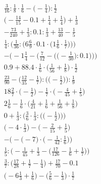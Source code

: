 \documentclass[8pt]{article}
\begin{document}
\begin{align}
\frac{3}{16} : \frac{1}{8} \cdot \frac{1}{6} - \big(-\frac{1}{4}\big) : \frac{1}{2} \\
\big(-\frac{14}{15} - 0.1 + \frac{1}{4} + \frac{1}{4}\big) + \frac{1}{3} \\
-\frac{73}{240} + \frac{1}{3} : 0.1 : \frac{1}{3} + \frac{13}{40} - \frac{1}{5} \\
\frac{1}{4} : \bigg(\frac{1}{36} : \Big(6\frac{6}{9} \cdot 0.1 \cdot \big(1\frac{1}{6} \cdot \frac{1}{7}\big)\Big)\bigg) \\
-\Bigg(-1\frac{1}{4} - \bigg(\frac{7}{12} - \Big(\big(-\frac{1}{30}\big) : 0.1\Big)\bigg)\Bigg) \\
0.9 + 88.4 \cdot \frac{1}{6} \cdot \big(\frac{1}{56} + \frac{1}{8}\big) \cdot \frac{1}{2} \\
\frac{23}{90} - \Big(\frac{12}{35} - \frac{1}{7}\Big) : \Big(\big(-\frac{1}{2}\big)\Big) : \frac{1}{9} \\
18\frac{2}{7} \cdot \big(-\frac{1}{2}\big) - \frac{1}{7} \cdot \big(-\frac{4}{45} + \frac{1}{5}\big) \\
2\frac{1}{6} - \frac{1}{6} \cdot \big(\frac{4}{21} + \frac{1}{6} + \frac{1}{56} + \frac{1}{8}\big) \\
0 + \frac{1}{3} : \bigg(\frac{3}{6} \cdot \frac{1}{3} : \Big(\big(-\frac{1}{2}\big)\Big)\bigg) \\
\big(-4 \cdot \frac{1}{3}\big) - \big(-\frac{2}{15} + \frac{1}{5}\big) \\
-\Big(-\big(-7\big) \cdot \big(-\frac{1}{42} : \frac{1}{6}\big)\Big) \\
\frac{1}{5} : \Big(-\frac{1}{45} + \frac{1}{3} - \big(\frac{17}{126} - \frac{1}{6} + \frac{1}{7}\big)\Big) \\
\frac{3}{7} : \big(\frac{17}{28} + \frac{1}{7} - \frac{1}{4}\big) + \frac{17}{70} - 0.1 \\
\big(-6\frac{1}{3} + \frac{1}{6}\big) - \big(\frac{5}{6} - \frac{1}{3}\big) \cdot \frac{1}{7}
\end{align}
\end{document}
